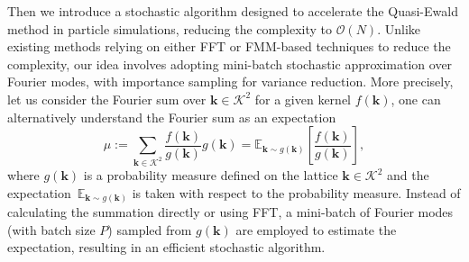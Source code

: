 Then we introduce a stochastic algorithm designed to accelerate the Quasi-Ewald method in particle simulations, reducing the complexity to $\mathcal{O}(N)$. 
Unlike existing methods relying on either FFT or FMM-based techniques to reduce the complexity, our idea involves adopting mini-batch stochastic approximation over Fourier modes, with importance sampling for variance reduction. 
More precisely, let us consider the Fourier sum over $\bm k \in \mathcal{K}^2$ for a given kernel $f(\bm{k})$,
one can alternatively understand the Fourier sum as an expectation
\begin{equation}
	\mu:=\sum_{\bm{k}\in\mathcal{K}^2}\frac{f(\bm{k})}{g(\bm{k})}g(\bm{k})=\mathbb{E}_{\bm k\sim g(\bm{k})}\left[\frac{f(\bm{k})}{g(\bm{k})}\right],
\end{equation}
where $g(\bm{k})$ is a probability measure defined on the lattice $\bm k \in \mathcal{K}^2$ and the expectation~$\mathbb{E}_{\bm k\sim g(\bm{k})}$ is taken with respect to the probability measure.
Instead of calculating the summation directly or using FFT, a mini-batch of Fourier modes (with batch size $P$) sampled from $g(\bm{k})$ are employed to estimate the expectation, resulting in an efficient stochastic algorithm.

